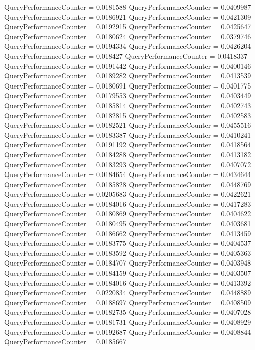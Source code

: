\documentclass[9pt]{article}
\theoremstyle{plain}
\theoremstyle{definition}
\theoremstyle{remark}
\numberwithin{equation}{section}
\begin{document}
QueryPerformanceCounter  =  0.0181588
QueryPerformanceCounter  =  0.0409987
QueryPerformanceCounter  =  0.0186921
QueryPerformanceCounter  =  0.0421309
QueryPerformanceCounter  =  0.0192915
QueryPerformanceCounter  =  0.0425647
QueryPerformanceCounter  =  0.0180624
QueryPerformanceCounter  =  0.0379746
QueryPerformanceCounter  =  0.0194334
QueryPerformanceCounter  =  0.0426204
QueryPerformanceCounter  =  0.018427
QueryPerformanceCounter  =  0.0418337
QueryPerformanceCounter  =  0.0191442
QueryPerformanceCounter  =  0.0400146
QueryPerformanceCounter  =  0.0189282
QueryPerformanceCounter  =  0.0413539
QueryPerformanceCounter  =  0.0180691
QueryPerformanceCounter  =  0.0401775
QueryPerformanceCounter  =  0.0179553
QueryPerformanceCounter  =  0.0403449
QueryPerformanceCounter  =  0.0185814
QueryPerformanceCounter  =  0.0402743
QueryPerformanceCounter  =  0.0182815
QueryPerformanceCounter  =  0.0402583
QueryPerformanceCounter  =  0.0182521
QueryPerformanceCounter  =  0.0455516
QueryPerformanceCounter  =  0.0183387
QueryPerformanceCounter  =  0.0410241
QueryPerformanceCounter  =  0.0191192
QueryPerformanceCounter  =  0.0418564
QueryPerformanceCounter  =  0.0184288
QueryPerformanceCounter  =  0.0413182
QueryPerformanceCounter  =  0.0183293
QueryPerformanceCounter  =  0.0407072
QueryPerformanceCounter  =  0.0184654
QueryPerformanceCounter  =  0.0434644
QueryPerformanceCounter  =  0.0185828
QueryPerformanceCounter  =  0.0448769
QueryPerformanceCounter  =  0.0205683
QueryPerformanceCounter  =  0.0422621
QueryPerformanceCounter  =  0.0184016
QueryPerformanceCounter  =  0.0417283
QueryPerformanceCounter  =  0.0180869
QueryPerformanceCounter  =  0.0404622
QueryPerformanceCounter  =  0.0180495
QueryPerformanceCounter  =  0.0403681
QueryPerformanceCounter  =  0.0186662
QueryPerformanceCounter  =  0.0413459
QueryPerformanceCounter  =  0.0183775
QueryPerformanceCounter  =  0.0404537
QueryPerformanceCounter  =  0.0183592
QueryPerformanceCounter  =  0.0405363
QueryPerformanceCounter  =  0.0184707
QueryPerformanceCounter  =  0.0403948
QueryPerformanceCounter  =  0.0184159
QueryPerformanceCounter  =  0.0403507
QueryPerformanceCounter  =  0.0184016
QueryPerformanceCounter  =  0.0413392
QueryPerformanceCounter  =  0.0220834
QueryPerformanceCounter  =  0.0448889
QueryPerformanceCounter  =  0.0188697
QueryPerformanceCounter  =  0.0408509
QueryPerformanceCounter  =  0.0182735
QueryPerformanceCounter  =  0.0407028
QueryPerformanceCounter  =  0.0181731
QueryPerformanceCounter  =  0.0408929
QueryPerformanceCounter  =  0.0192687
QueryPerformanceCounter  =  0.0408844
QueryPerformanceCounter  =  0.0185667
\end{document}
